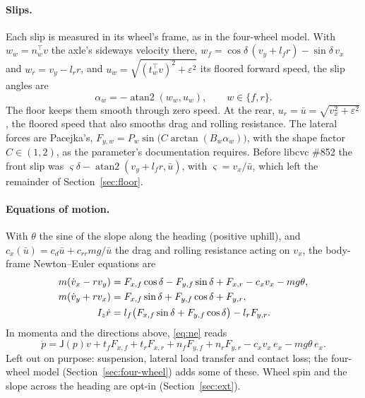 \documentclass[11pt]{article}
\theoremstyle{remark}
\newcommand{\J}{\mathsf J}
\newcommand{\ub}{\bar u}
\newcommand{\T}{^{\top}}
\begin{document}
\paragraph{Slips.} Each slip is measured in its wheel's frame, as in the four-wheel model. With
$w_w=n_w\T v$ the axle's sideways velocity there, $w_f=\cos\delta\,(v_y+l_fr)-\sin\delta\,v_x$ and
$w_r=v_y-l_rr$, and $u_w=\sqrt{(t_w\T v)^2+\varepsilon^2}$ its floored forward speed, the slip
angles are
\begin{equation}
  \alpha_w=-\operatorname{atan2}(w_w,u_w),\qquad w\in\{f,r\}.
  \label{eq:slips}
\end{equation}
The floor keeps them smooth through zero speed. At the rear, $u_r=\ub=\sqrt{v_x^2+\varepsilon^2}$,
the floored speed that also smooths drag and rolling resistance. The lateral forces are Pacejka's,
$F_{y,w}=P_w\sin\!\big(C\arctan(B_w\alpha_w)\big)$, with the shape factor $C\in(1,2)$, as the
parameter's documentation requires. Before libcvc \#852 the front slip was
$\varsigma\delta-\operatorname{atan2}(v_y+l_fr,\ub)$, with $\varsigma=v_x/\ub$, which left the
remainder of Section~\ref{sec:floor}.

\paragraph{Equations of motion.} With $\theta$ the sine of the slope along the heading (positive
uphill), and $c_x(\ub)=c_d\ub+c_{rr}mg/\ub$ the drag and rolling resistance acting on $v_x$, the
body-frame Newton--Euler equations are
\begin{align}
  m(\dot v_x-rv_y)&=F_{x,f}\cos\delta-F_{y,f}\sin\delta+F_{x,r}-c_x v_x-mg\theta,\notag\\
  m(\dot v_y+rv_x)&=F_{x,f}\sin\delta+F_{y,f}\cos\delta+F_{y,r},\label{eq:ne}\\
  I_z\dot r&=l_f\big(F_{x,f}\sin\delta+F_{y,f}\cos\delta\big)-l_rF_{y,r}.\notag
\end{align}
In momenta and the directions above, \eqref{eq:ne} reads
\begin{equation}
  \dot p=\J(p)v+t_fF_{x,f}+t_rF_{x,r}+n_fF_{y,f}+n_rF_{y,r}-c_xv_x\,e_x-mg\theta\,e_x .
  \label{eq:ne-p}
\end{equation}
Left out on purpose: suspension, lateral load transfer and contact loss; the four-wheel model
(Section~\ref{sec:four-wheel}) adds some of these. Wheel spin and the slope across the heading are
opt-in (Section~\ref{sec:ext}).

\end{document}
